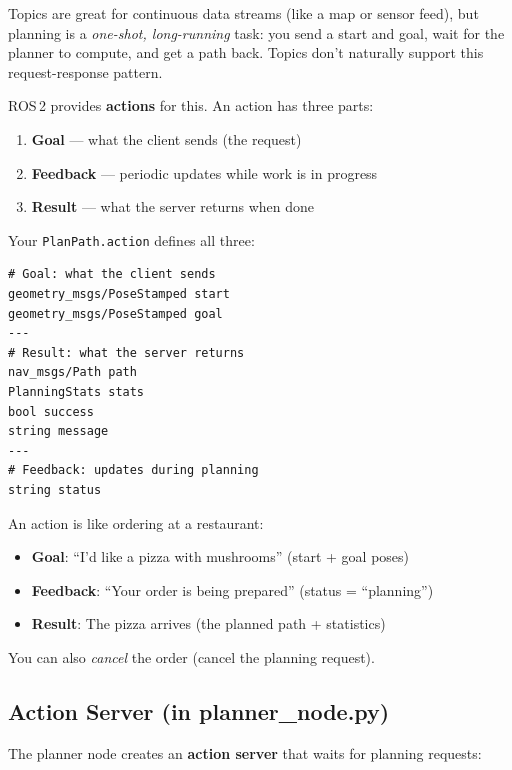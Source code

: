 \documentclass[12pt, a4paper]{article}
\begin{document}
Topics are great for continuous data streams (like a map or sensor feed),
but planning is a \emph{one-shot, long-running} task: you send a start and
goal, wait for the planner to compute, and get a path back. Topics don't
naturally support this request-response pattern.

ROS\,2 provides \textbf{actions} for this. An action has three parts:

\begin{enumerate}[nosep]
    \item \textbf{Goal} --- what the client sends (the request)
    \item \textbf{Feedback} --- periodic updates while work is in progress
    \item \textbf{Result} --- what the server returns when done
\end{enumerate}

Your \texttt{PlanPath.action} defines all three:

\begin{lstlisting}[style=msg, caption={action/PlanPath.action}]
# Goal: what the client sends
geometry_msgs/PoseStamped start
geometry_msgs/PoseStamped goal
---
# Result: what the server returns
nav_msgs/Path path
PlanningStats stats
bool success
string message
---
# Feedback: updates during planning
string status
\end{lstlisting}

\begin{analogybox}
An action is like ordering at a restaurant:
\begin{itemize}[nosep]
    \item \textbf{Goal}: ``I'd like a pizza with mushrooms'' (start + goal poses)
    \item \textbf{Feedback}: ``Your order is being prepared'' (status = ``planning'')
    \item \textbf{Result}: The pizza arrives (the planned path + statistics)
\end{itemize}
You can also \emph{cancel} the order (cancel the planning request).
\end{analogybox}

\subsection{Action Server (in planner\_node.py)}

The planner node creates an \textbf{action server} that waits for planning
requests:
\end{document}
